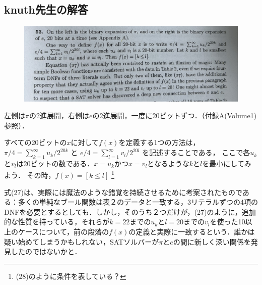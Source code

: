 \documentclass[dvipdfmx,a4paper,12pt]{jsarticle}
\begin{document}
 \subsection*{knuth先生の解答}
  \begin{figure}[htbp]
  \centering
  \includegraphics[width=142mm,angle=0]{images/53_a.jpg}
  \end{figure}
  
  
  
 左側は$π$の2進展開，右側は$e$の2進展開，一度に20ビットずつ．（付録A(Volume1)参照）．
 
すべての20ビットの$x$に対して$f(x)$を定義する1つの方法は，$π/4 = \sum_{k=1}^\infty u_{k}/2^{20k}$ と $e/4 = \sum_{l=1}^\infty v_{l}/2^{20l}$ を記述することである，
ここで各$u_{k}$と$v_{l}$は20ビットの数である．$x=u_{k}$かつ$x=v_{l}$となるような$k$と$l$を最小にしてみよう．
その時，$f(x) = [k \leq l]$ \footnote{(28)のように条件を表している？}

式(27)は、実際には魔法のような錯覚を持続させるために考案されたものである：多くの単純なブール関数は表２のデータと一致する，3リテラルずつの4項のDNFを必要とするとしても．しかし，そのうち２つだけが，(27)のように，追加的な性質を持っている，それらが$k=22$までの$u_{k}$と$l=20$までの$v_{l}$を使った10以上のケースについて，前の段落の$f(x)$の定義と実際に一致するという．誰かは疑い始めてしまうかもしれない，SATソルバーが$π$と$e$の間に新しく深い関係を発見したのではないかと．
\end{document}
